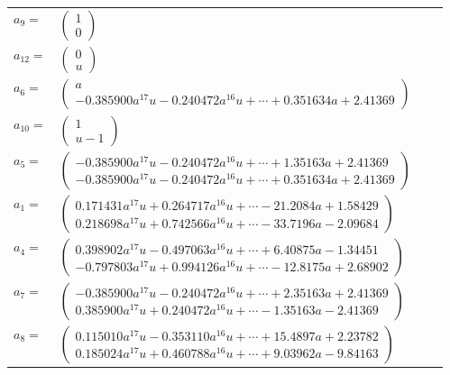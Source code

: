 \documentclass[1p]{elsarticle_modified}
\theoremstyle{definition}
\begin{document}
\begin{tabular}{m{7pt} m{180pt} m{7pt} m{180pt} }
\flushright $a_{9}=$&$\begin{pmatrix}1\\0\end{pmatrix}$ \\
\flushright $a_{12}=$&$\begin{pmatrix}0\\u\end{pmatrix}$ \\
\flushright $a_{6}=$&$\begin{pmatrix}a\\-0.385900 a^{17} u-0.240472 a^{16} u+\cdots+0.351634 a+2.41369\end{pmatrix}$ \\
\flushright $a_{10}=$&$\begin{pmatrix}1\\u-1\end{pmatrix}$ \\
\flushright $a_{5}=$&$\begin{pmatrix}-0.385900 a^{17} u-0.240472 a^{16} u+\cdots+1.35163 a+2.41369\\-0.385900 a^{17} u-0.240472 a^{16} u+\cdots+0.351634 a+2.41369\end{pmatrix}$ \\
\flushright $a_{1}=$&$\begin{pmatrix}0.171431 a^{17} u+0.264717 a^{16} u+\cdots-21.2084 a+1.58429\\0.218698 a^{17} u+0.742566 a^{16} u+\cdots-33.7196 a-2.09684\end{pmatrix}$ \\
\flushright $a_{4}=$&$\begin{pmatrix}0.398902 a^{17} u-0.497063 a^{16} u+\cdots+6.40875 a-1.34451\\-0.797803 a^{17} u+0.994126 a^{16} u+\cdots-12.8175 a+2.68902\end{pmatrix}$ \\
\flushright $a_{7}=$&$\begin{pmatrix}-0.385900 a^{17} u-0.240472 a^{16} u+\cdots+2.35163 a+2.41369\\0.385900 a^{17} u+0.240472 a^{16} u+\cdots-1.35163 a-2.41369\end{pmatrix}$ \\
\flushright $a_{8}=$&$\begin{pmatrix}0.115010 a^{17} u-0.353110 a^{16} u+\cdots+15.4897 a+2.23782\\0.185024 a^{17} u+0.460788 a^{16} u+\cdots+9.03962 a-9.84163\end{pmatrix}$ \\

\end{tabular}
\end{document}
